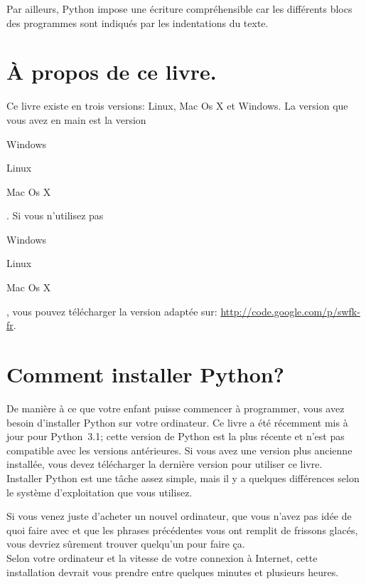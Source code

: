 Par ailleurs, Python impose une écriture compréhensible car les différents blocs des programmes sont indiqués par les indentations du texte.

\section*{À propos de ce livre.}

Ce livre existe en trois versions: Linux, Mac Os X et Windows. La version que vous avez en main est la version  \begin{WINDOWS}Windows\end{WINDOWS}\begin{LINUX}Linux\end{LINUX}\begin{MAC}Mac Os X\end{MAC}. Si vous n'utilisez pas \begin{WINDOWS}Windows\end{WINDOWS}\begin{LINUX}Linux\end{LINUX}\begin{MAC}Mac Os X\end{MAC}, vous pouvez télécharger la version adaptée sur: \url{http://code.google.com/p/swfk-fr}.
\\
\bigskip
\section*{Comment installer Python?}
De manière à ce que votre enfant puisse commencer à programmer, vous avez besoin d'installer Python sur votre ordinateur. Ce livre a été récemment mis à jour pour Python 3.1; cette version de Python est la plus récente et n'est pas compatible avec les versions antérieures. Si vous avez une version plus ancienne installée, vous devez télécharger la dernière version pour utiliser ce livre.
\\


Installer Python est une tâche assez simple, mais il y a quelques différences selon le système d'exploitation que vous utilisez. 




Si vous venez juste d'acheter un nouvel ordinateur, que vous n'avez pas idée de quoi faire avec et que les phrases précédentes vous ont remplit de frissons glacés, vous devriez sûrement trouver quelqu'un pour faire ça.\\


Selon votre ordinateur et la vitesse de votre connexion à Internet, cette installation devrait vous prendre entre quelques minutes et plusieurs heures.

